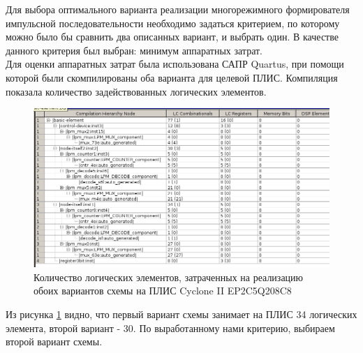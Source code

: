 Для выбора оптимального варианта реализации многорежимного формирователя импульсной последовательности необходимо задаться критерием, по которому можно было бы сравнить два описанных вариант, и выбрать один. В качестве данного критерия был выбран: минимум аппаратных затрат. \\
Для оценки аппаратных затрат была использована САПР Quartus, при помощи которой были скомпилированы оба варианта для целевой ПЛИС. Компиляция показала количество задействованных логических элементов.
\begin{figure}
  \includegraphics[scale=0.65]{./logics-count.png}
  \caption{Количество логических элементов, затраченных на реализацию обоих вариантов схемы на ПЛИС Cyclone II EP2C5Q208C8}
  \label{fig:logicscount}
\end{figure}
Из рисунка \ref{fig:logicscount} видно, что первый вариант схемы занимает на ПЛИС 34 логических элемента, второй вариант - 30. По выработанному нами критерию, выбираем второй вариант схемы.